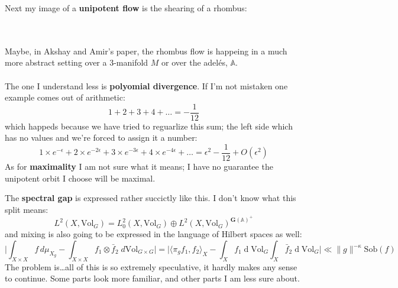\documentclass[12pt]{article}
\begin{document}
Next my image of a \textbf{unipotent flow} is the shearing of a rhombus: \\ \\
 \\ 
Maybe, in Akshay and Amir's paper, the rhombus flow is happeing in a much more abstract setting over a 3-manifold $M$ or over the adel\'{e}s, $\mathbb{A}$. \\ \\
The one I understand less is \textbf{polyomial divergence}.  If I'm not mistaken one example comes out of arithmetic:
$$  1 + 2 + 3 + 4 + \dots = - \frac{1}{12}$$
which happeds because we have tried to reguarlize this sum; the left side which has no values and we're forced to assign it a number:
$$  1 \times e^{-\epsilon}+  2 \times e^{-2\epsilon} + 3 \times e^{-3\epsilon} + 4 \times e^{-4\epsilon} + \dots =  \epsilon^2 - \frac{1}{12} + O(\epsilon^2)$$
As for \textbf{maximality} I am not sure what it means;  I have no guarantee the unipotent orbit I choose will be maximal.

\newpage

\noindent The \textbf{spectral gap} is expressed rather succictly like this.  I don't know what this split means:
$$ L^2(X,\text{Vol}_G)=L^2_0(X,\text{Vol}_G)\oplus L^2(X,\text{Vol}_G)^{\mathbf{G}(\mathbb{A})^+} $$
and mixing is also going to be expressed in the language of Hilbert spaces as well:
$$ 
\Big|\int_{X\times X}
 f \, d\mu_{X_g} 
 -\int_{X\times X} f_1\otimes\bar f_2 \; d\text{Vol}_{G\times G}\Big|
 =\Big|\langle \pi_gf_1, f_2\rangle_X-
 \int_X f_1\operatorname{d}\!\text{Vol}_G\int_X\bar f_2\operatorname{d}\!\text{Vol}_G\Big|\ll 
 \|g\|^{-\kappa}\text{Sob}(f) $$
The problem is\dots all of this is so extremely speculative, it hardly makes any sense to continue.  Some parts look more familiar, and other parts I am less sure about.
\end{document}
